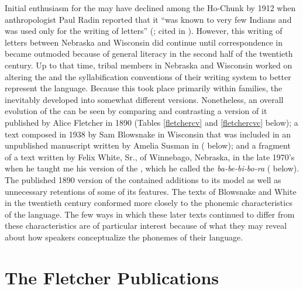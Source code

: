 \documentclass[output=paper]{LSP/langsci}
\begin{document}
Initial enthusiasm for the  may have declined among the Ho-Chunk by 1912 when anthropologist Paul Radin reported that it ``was known to very few Indians and was used only for the writing of letters'' (\citealt[21]{Radin1954}; cited in \citealt[161]{Walker1981}). However, this writing of letters between Nebraska and Wisconsin did continue until correspondence in  became outmoded because of general  literacy in the second half of the twentieth century. Up to that time, tribal members in Nebraska and Wisconsin worked on altering the  and the syllabification conventions of their writing system to better represent the  language. Because this took place primarily within families, the  inevitably developed into somewhat different versions. Nonetheless, an overall evolution of the   can be seen by comparing and contrasting a version of it published by Alice Fletcher in 1890 (Tables \ref{fletchercv} and \ref{fletchercvc} below); a  text composed in 1938 by Sam Blowsnake in Wisconsin that was included in an unpublished manuscript written by Amelia Susman in \citeyear{Susman1939} ( below); and a fragment of a text written by Felix White, Sr., of Winnebago, Nebraska, in the late 1970's when he taught me his version of the , which he called the \emph{ba-be-bi-bo-ra} ( below). The published 1890 version of the   contained additions to its  model as well as unnecessary retentions of some of its features. The texts of Blowsnake and White in the twentieth century conformed more closely to the phonemic characteristics of the  language. The few ways in which these later texts continued to differ from these characteristics are of particular interest because of what they may reveal about how  speakers conceptualize the phonemes of their language.

\section{The Fletcher Publications}
\end{document}
